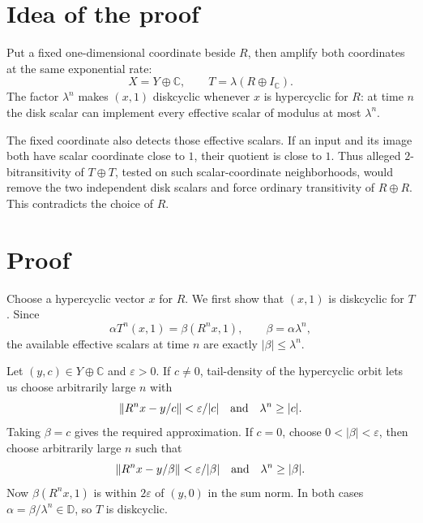 \documentclass[11pt]{article}
\newcommand{\D}{\mathbb D}
\newcommand{\C}{\mathbb C}
\begin{document}
\section{Idea of the proof}

Put a fixed one-dimensional coordinate beside $R$, then amplify both
coordinates at the same exponential rate:
\[
 X=Y\oplus\C,\qquad T=\lambda(R\oplus I_{\C}).
\]
The factor $\lambda^n$ makes $(x,1)$ diskcyclic whenever $x$ is
hypercyclic for $R$: at time $n$ the disk scalar can implement every
effective scalar of modulus at most $\lambda^n$.

The fixed coordinate also detects those effective scalars.  If an input
and its image both have scalar coordinate close to $1$, their quotient is
close to $1$.  Thus alleged $2$-bitransitivity of $T\oplus T$, tested on
such scalar-coordinate neighborhoods, would remove the two independent
disk scalars and force ordinary transitivity of $R\oplus R$.  This
contradicts the choice of $R$.

\section{Proof}

Choose a hypercyclic vector $x$ for $R$.  We first show that $(x,1)$ is
diskcyclic for $T$.  Since
\[
 \alpha T^n(x,1)=\beta(R^n x,1),\qquad
 \beta=\alpha\lambda^n,
\]
the available effective scalars at time $n$ are exactly
$|\beta|\le\lambda^n$.

Let $(y,c)\in Y\oplus\C$ and $\varepsilon>0$.  If $c\ne0$, tail-density
of the hypercyclic orbit lets us choose arbitrarily large $n$ with
\[
 \|R^n x-y/c\|<\varepsilon/|c|
 \quad\hbox{and}\quad \lambda^n\ge |c|.
\]
Taking $\beta=c$ gives the required approximation.  If $c=0$, choose
$0<|\beta|<\varepsilon$, then choose arbitrarily large $n$ such that
\[
 \|R^n x-y/\beta\|<\varepsilon/|\beta|
 \quad\hbox{and}\quad \lambda^n\ge |\beta|.
\]
Now $\beta(R^n x,1)$ is within $2\varepsilon$ of $(y,0)$ in the sum norm.
In both cases $\alpha=\beta/\lambda^n\in\D$, so $T$ is diskcyclic.
\end{document}
